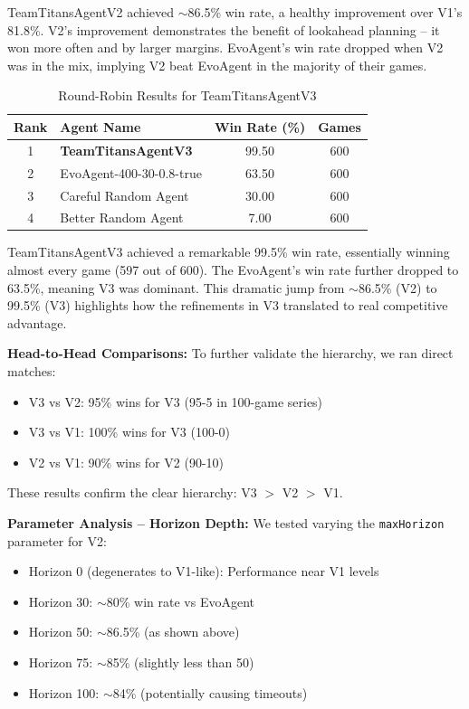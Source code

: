 \documentclass[conference]{IEEEtran}
\begin{document}
TeamTitansAgentV2 achieved $\sim$86.5\% win rate, a healthy improvement over V1's 81.8\%. V2's improvement demonstrates the benefit of lookahead planning -- it won more often and by larger margins. EvoAgent's win rate dropped when V2 was in the mix, implying V2 beat EvoAgent in the majority of their games.

\begin{table}[htbp]
\caption{Round-Robin Results for TeamTitansAgentV3}
\begin{center}
\begin{tabular}{|c|l|c|c|}
\hline
\textbf{Rank} & \textbf{Agent Name} & \textbf{Win Rate (\%)} & \textbf{Games} \\
\hline
1 & \textbf{TeamTitansAgentV3} & 99.50 & 600 \\
2 & EvoAgent-400-30-0.8-true & 63.50 & 600 \\
3 & Careful Random Agent & 30.00 & 600 \\
4 & Better Random Agent & 7.00 & 600 \\
\hline
\end{tabular}
\label{tab:v3_results}
\end{center}
\end{table}

TeamTitansAgentV3 achieved a remarkable 99.5\% win rate, essentially winning almost every game (597 out of 600). The EvoAgent's win rate further dropped to 63.5\%, meaning V3 was dominant. This dramatic jump from $\sim$86.5\% (V2) to 99.5\% (V3) highlights how the refinements in V3 translated to real competitive advantage.

\textbf{Head-to-Head Comparisons:} To further validate the hierarchy, we ran direct matches:
\begin{itemize}
\item V3 vs V2: 95\% wins for V3 (95-5 in 100-game series)
\item V3 vs V1: 100\% wins for V3 (100-0)
\item V2 vs V1: 90\% wins for V2 (90-10)
\end{itemize}

These results confirm the clear hierarchy: V3 $>$ V2 $>$ V1.

\textbf{Parameter Analysis -- Horizon Depth:} We tested varying the \texttt{maxHorizon} parameter for V2:
\begin{itemize}
\item Horizon 0 (degenerates to V1-like): Performance near V1 levels
\item Horizon 30: $\sim$80\% win rate vs EvoAgent
\item Horizon 50: $\sim$86.5\% (as shown above)
\item Horizon 75: $\sim$85\% (slightly less than 50)
\item Horizon 100: $\sim$84\% (potentially causing timeouts)
\end{itemize}
\end{document}
